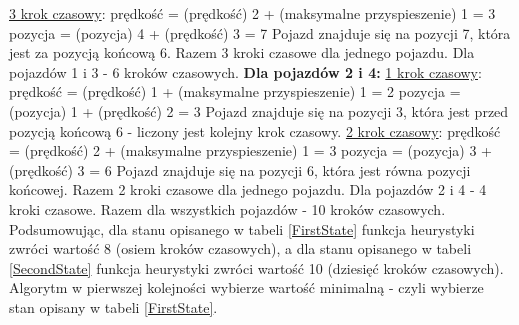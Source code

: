 \newline
\underline{3 krok czasowy}:
\newline
\newline
prędkość = (prędkość) 2 + (maksymalne przyspieszenie) 1 = 3
\newline
pozycja = (pozycja) 4 + (prędkość) 3 = 7
\newline
\newline
Pojazd znajduje się na pozycji 7, która jest za pozycją końcową 6.
\newline
\newline
Razem 3 kroki czasowe dla jednego pojazdu. Dla pojazdów 1 i 3 - 6 kroków czasowych.
\newline
\newline
\textbf{Dla pojazdów 2 i 4:}
\newline
\newline
\underline{1 krok czasowy}:
\newline
\newline
prędkość = (prędkość) 1 + (maksymalne przyspieszenie) 1 = 2
\newline
pozycja = (pozycja) 1 + (prędkość) 2 = 3
\newline
\newline
Pojazd znajduje się na pozycji 3, która jest przed pozycją końcową 6 - liczony jest kolejny krok czasowy.
\newline
\newline
\underline{2 krok czasowy}:
\newline
\newline
prędkość = (prędkość) 2 + (maksymalne przyspieszenie) 1 = 3
\newline
pozycja = (pozycja) 3 + (prędkość) 3 = 6
\newline
\newline
Pojazd znajduje się na pozycji 6, która jest równa pozycji końcowej.
\newline
\newline
Razem 2 kroki czasowe dla jednego pojazdu. Dla pojazdów 2 i 4 - 4 kroki czasowe.
\newline
\newline
Razem dla wszystkich pojazdów - 10 kroków czasowych.
\newline
\newline
\newline
Podsumowując, dla stanu opisanego w tabeli \ref{FirstState} funkcja heurystyki zwróci wartość 8 (osiem kroków czasowych), a dla stanu opisanego w tabeli \ref{SecondState} funkcja heurystyki zwróci wartość 10 (dziesięć kroków czasowych). Algorytm w pierwszej kolejności wybierze wartość minimalną - czyli wybierze stan opisany w tabeli \ref{FirstState}.

